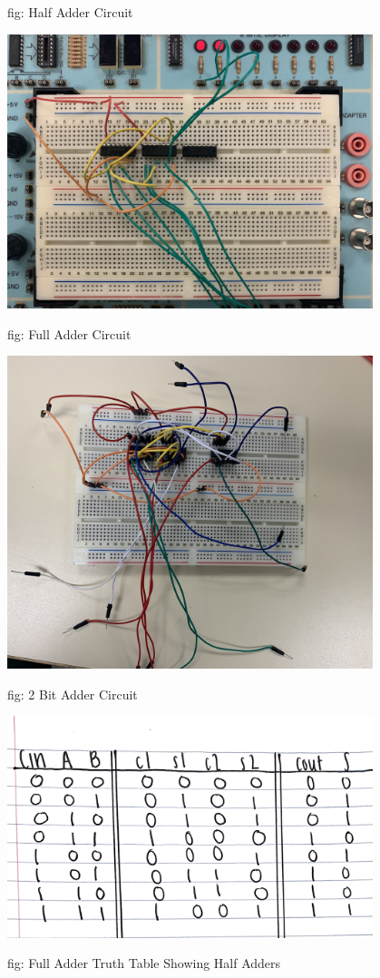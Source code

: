 \documentclass[11pt]{article}
\begin{document}
\begin{center}
\caption{fig: Half Adder Circuit}
	
	\includegraphics[width=0.8\textwidth,trim=0cm 0cm 0.6cm 0cm,clip]{FA}
	
\caption{fig: Full Adder Circuit}

	\includegraphics[width=0.8\textwidth,trim=0cm 0cm 0.6cm 0cm,clip]{2BA}
	
\caption{fig: 2 Bit Adder Circuit}
	
	\includegraphics[width=0.8\textwidth,trim=0cm 0cm 0.6cm 0cm,clip]{HATruth}
	
\caption{fig: Full Adder Truth Table Showing Half Adders}
	
\end{center}
\end{document}

